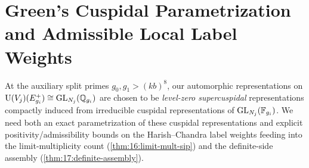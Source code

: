 \section{Green's Cuspidal Parametrization and Admissible Local Label Weights}
\label{sec:17:green-weights}

At the auxiliary split primes $g_0, g_1 > (k b)^8$, our automorphic representations on $\mathrm{U}(V_j)(E_{g_i}^+) \cong \mathrm{GL}_{N_j}(\mathbb{Q}_{g_i})$ are chosen to be \emph{level-zero supercuspidal} representations compactly induced from irreducible cuspidal representations of $\mathrm{GL}_{N_j}(\mathbb{F}_{g_i})$. We need both an exact parametrization of these cuspidal representations and explicit positivity/admissibility bounds on the Harish--Chandra label weights feeding into the limit-multiplicity count (\cref{thm:16:limit-mult-sip}) and the definite-side assembly (\cref{thm:17:definite-assembly}).


